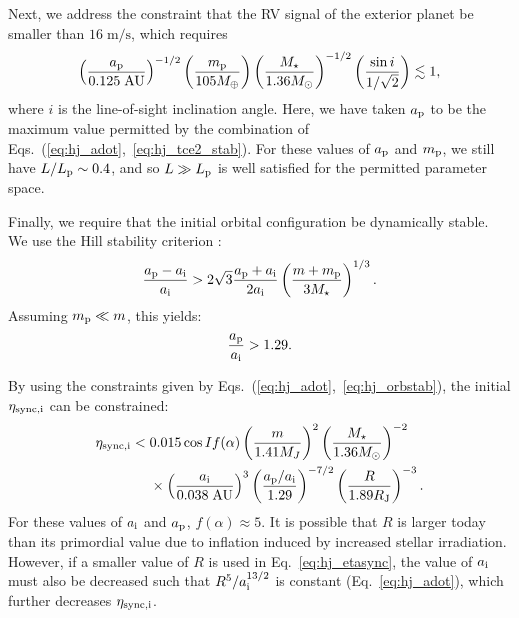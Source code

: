 \documentclass[
        fleqn,
        usenatbib,
    ]{mnras}
\newcommand*{\p}[1]{\left(#1\right)}
\begin{document}
Next, we address the constraint that the RV signal of the exterior planet be
smaller than $16\;\mathrm{m/s}$, which requires
\begin{equation}
    \p{\frac{a_{\rm p}}{0.125\;\mathrm{AU}}}^{-1/2}
    \p{\frac{m_{\rm p}}{105M_{\oplus}}}
    \p{\frac{M_\star}{1.36M_{\odot}}}^{-1/2}
    \p{\frac{\sin i}{1 / \sqrt{2}}} \lesssim 1,
    \label{eq:hj_rv}
\end{equation}
where $i$ is the line-of-sight inclination angle. Here, we have taken $a_{\rm
p}$ to be the maximum value permitted by the combination of
Eqs.~(\ref{eq:hj_adot},~\ref{eq:hj_tce2_stab}). For these values of $a_{\rm p}$
and $m_{\rm p}$, we still have $L / L_{\rm p} \sim 0.4$, and so $L \gg L_{\rm
p}$ is well satisfied for the permitted parameter space.

Finally, we require that the initial orbital configuration be dynamically
stable. We use the Hill stability criterion \citep[e.g.][]{petit2020path}:
\begin{equation}
    \frac{a_{\rm p} - a_{\rm i}}{a_{\rm i}} > 2\sqrt{3}\frac{a_{\rm p} + a_{\rm
        i}}{2a_{\rm i}} \p{\frac{m + m_{\rm p}}{3M_{\star}}}^{1/3}.
\end{equation}
Assuming $m_{\rm p} \ll m$, this yields:
\begin{equation}
    \frac{a_{\rm p}}{a_{\rm i}} > 1.29.\label{eq:hj_orbstab}
\end{equation}

By using the constraints given by Eqs.~(\ref{eq:hj_adot},~\ref{eq:hj_orbstab}),
the initial $\eta_{\rm sync, i}$ can be constrained:
\begin{align}
    \eta_{\rm sync, i} <{}& 0.015 \cos I f(\alpha)
            \p{\frac{m}{1.41M_J}}^2
            \p{\frac{M_\star}{1.36M_{\odot}}}^{-2}
            \nonumber\\
        &\times
            \p{\frac{a_{\rm i}}{0.038\;\mathrm{AU}}}^{3}
            \p{\frac{a_{\rm p} / a_{\rm i}}{1.29}}^{-7/2}
            \p{\frac{R}{1.89R_{\rm J}}}^{-3}.\label{eq:hj_etasync}
\end{align}
For these values of $a_{\rm i}$ and $a_{\rm p}$, $f(\alpha) \approx 5$. It is
possible that $R$ is larger today than its primordial value due to inflation
induced by increased stellar irradiation. However, if a smaller value of $R$ is
used in Eq.~\eqref{eq:hj_etasync}, the value of $a_{\rm i}$ must also be
decreased such that $R^5 / a_{\rm i}^{13/2}$ is constant (Eq.~\ref{eq:hj_adot}),
which further decreases $\eta_{\rm sync, i}$.
\end{document}
